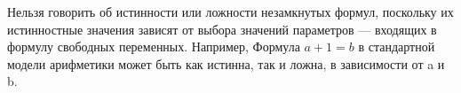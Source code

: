 \begin{remark}
	Нельзя говорить об истинности или ложности незамкнутых формул, поскольку их истинностные значения зависят от выбора
	значений параметров — входящих в формулу свободных переменных. Например, Формула $a+1 = b$  в стандартной
	модели арифметики может быть как истинна, так и ложна, в зависимости от a и b.
\end{remark}

